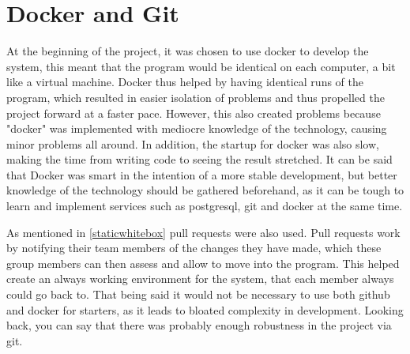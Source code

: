\section{Docker and Git}
At the beginning of the project, it was chosen to use docker to develop the system, this meant that the program would be identical on each computer, a bit like a virtual machine.
Docker thus helped by having identical runs of the program, which resulted in easier isolation of problems and thus propelled the project forward at a faster pace.
However, this also created problems because "docker" was implemented with mediocre knowledge of the technology, causing minor problems all around.
In addition, the startup for docker was also slow, making the time from writing code to seeing the result stretched.
It can be said that Docker was smart in the intention of a more stable development, but better knowledge of the technology should be gathered beforehand, as it can be tough to learn and implement services such as postgresql, git and docker at the same time.

As mentioned in \cref{staticwhitebox} pull requests were also used. Pull requests work by notifying their team members of the changes they have made, which these group members can then assess and allow to move into the program. This helped create an always working environment for the system, that each member always could go back to.
That being said it would not be necessary to use both github and docker for starters, as it leads to bloated complexity in development. 
Looking back, you can say that there was probably enough robustness in the project via git.